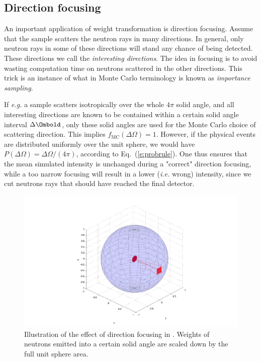 \subsection{Direction focusing}
\label{s:focus}

An important application of weight transformation is direction focusing.
Assume that the sample scatters the neutron rays in many directions.
In general, only neutron rays in some of these directions will
stand any chance of being detected. These directions we call
the {\em interesting directions}.
The idea in focusing is to avoid wasting computation time on
neutrons scattered in the other directions.
This trick is an instance of what in Monte Carlo terminology
is known as {\em importance sampling}. %

If {\em e.g.} a sample scatters isotropically
over the whole $4\pi$ solid angle, and all interesting
directions are known to be contained within a certain
solid angle interval $\Delta \Ombold$, only these solid angles
are used for the Monte Carlo choice of scattering direction.
This implies $f_\mathrm{MC}(\Delta\Omega) = 1$. However, if the physical
events are distributed uniformly over the unit sphere, we would have
$P(\Delta\Omega) = \Delta\Omega / (4\pi)$, according to Eq.~(\ref{e:probrule}).
One thus ensures that the mean simulated intensity is unchanged
during a "correct" direction focusing, while a too narrow focusing will
result in a lower (\textit{i.e.} wrong) intensity, since
we cut neutrons rays that should have reached the final detector.

\begin{figure}[htb!]
\begin{center}
\includegraphics[width=.8\textwidth]{figures/focusing}
\end{center}
\caption{Illustration of the effect of direction focusing in \MCS
  . Weights of neutrons emitted into a certain solid angle are
  scaled down by the full unit sphere area.}
\label{fig:focusing}
\end{figure}

